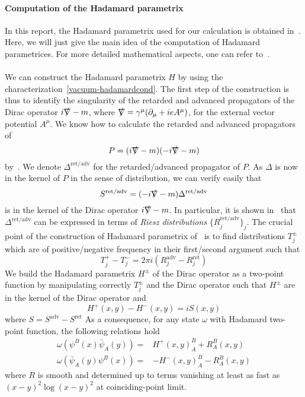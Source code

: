 \paragraph{Computation of the Hadamard parametrix}
In this report, the Hadamard parametrix used for our calculation is obtained in~\cite{Zahn2015}. 
Here, we will just give the main idea of the computation of Hadamard parametrices. 
For more detailed mathematical aspects, one can refer to~\cite{Bar2008}. \\\\
%
We can construct the Hadamard parametrix $H$ by using the characterization~\cref{vacuum-hadamardcond}. 
The first step of the construction is thus to identify the singularity of the retarded and advanced propagators of the Dirac operator $i\slashed{\nabla} - m$, where $\slashed{\nabla} = \gamma^\mu(\partial_\mu + ieA^\mu)$, for the external vector potential $A^\mu$. 
We know how to calculate the retarded and advanced propagators of 
\begin{equation*}
P = (i\slashed{\nabla} - m)(-i\slashed{\nabla} -m) 
\end{equation*}
by~\cite{Bar2008}.
We denote $\Delta^{\mathrm{ret/adv}}$ for the retarded/advanced propagator of $P$.
As $\Delta$ is now in the kernel of $P$ in the sense of distribution, 
we can verify easily that 
\begin{equation*}
S^{\textrm{ret/adv}} = (-i\slashed{\nabla} - m)\Delta^{\textrm{ret/adv}} 
\end{equation*}
is in the kernel of the Dirac operator $i\slashed{\nabla} - m$.
In particular, it is shown in~\cite{Bar2008} that $\Delta^{\mathrm{ret/adv}}$ can be expressed in terms of \textit{Riesz distributions} $\{R_j^{\mathrm{ret/adv}}\}_j$.
The crucial point of the construction of Hadamard parametrix of~\cite{Zahn2015} is to find distributions $T_j^{\pm}$ which are of positive/negative frequency in their first/second argument such that
\begin{equation*}
T_j^+ - T_j^- = 2\pi i(R_j^{\mathrm{adv}} - R_j^{\mathrm{ret}})
\end{equation*} 
We build the Hadamard parametrix $H^\pm$ of the Dirac operator as a two-point function by manipulating correctly $T_j^{\pm}$ and the Dirac operator such that $H^\pm$ are in the kernel of the Dirac operator 
and 
\begin{equation}\label{intro-hh}
H^+(x,y) - H^-(x,y) = i S(x,y)
\end{equation}
where $S = S^{\mathrm{adv}} - S^{\mathrm{ret}}$
As a consequence, for any state $\omega$ with Hadamard two-point function, the following relations hold
\begin{equation}\label{intro-renormalization}
\begin{split}
\omega(\psi^B(x)\bar{\psi}_A(y)) = & H^+(x,y)^B_A + R^B_A(x,y) \\
\omega(\bar{\psi}_A(y)\psi^B(x)) = &- H^-(x,y)^B_A - R^B_A(x,y)
\end{split}
\end{equation}
where $R$ is smooth and determined up to terms vanishing at least as fast as $(x-y)^2 \log(x-y)^2$ at coinciding-point limit. 
%
